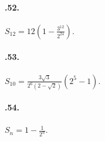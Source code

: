 \begin{multicols}{2}
\paragraph{\thechapter.52.} $S_{12}=12\left(1-\frac{3^{12}}{2^{24}}\right)$.

\paragraph{\thechapter.53.} $S_{10}=\frac{3\sqrt{3}}{2^6\left(2-\sqrt{2}\right)}\left(2^5-1\right)$.

\paragraph{\thechapter.54.} $S_{n}=1-\frac{1}{2^n}$.

\end{multicols}

